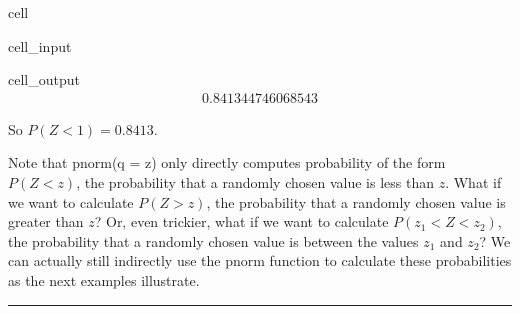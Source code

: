 \documentclass[letterpaper,10pt,english]{jupyterBook}
\begin{document}
\begin{sphinxuseclass}{cell}\begin{sphinxVerbatimInput}

\begin{sphinxuseclass}{cell_input}
\begin{sphinxVerbatim}[commandchars=\\\{\}]
\end{sphinxVerbatim}

\end{sphinxuseclass}\end{sphinxVerbatimInput}
\begin{sphinxVerbatimOutput}

\begin{sphinxuseclass}{cell_output}\begin{equation*}
\begin{split}0.841344746068543\end{split}
\end{equation*}
\end{sphinxuseclass}\end{sphinxVerbatimOutput}

\end{sphinxuseclass}
\sphinxAtStartPar
So \(P(Z < 1) = 0.8413\).

\sphinxAtStartPar
Note that pnorm(q = z) only directly computes probability of the form \(P(Z < z)\), the probability that a randomly chosen value is less than \(z\). What if we want to calculate \(P(Z > z)\), the probability that a randomly chosen value is greater than \(z\)? Or, even trickier, what if we want to calculate \(P(z_1 < Z < z_2)\), the probability that a randomly chosen value is between the values \(z_1\) and \(z_2\)? We can actually still indirectly use the pnorm function to calculate these probabilities as the next examples illustrate.


\bigskip\hrule\bigskip
\end{document}
